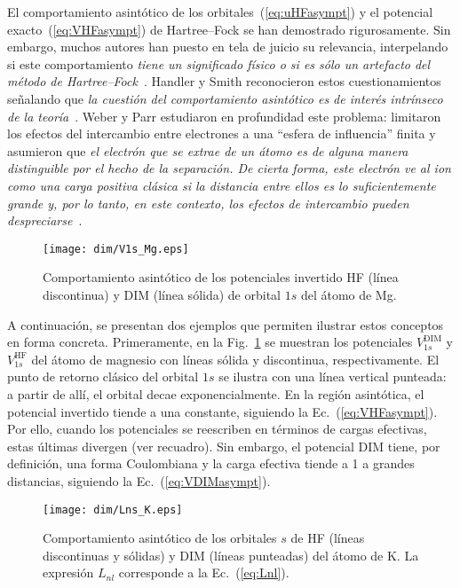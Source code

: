 El comportamiento asintótico de los orbitales~(\ref{eq:uHFasympt}) y el 
potencial exacto~(\ref{eq:VHFasympt}) de Hartree--Fock se han demostrado 
rigurosamente. Sin embargo, muchos autores han puesto en tela de juicio 
su relevancia, interpelando si este comportamiento \textit{tiene un 
significado físico o si es sólo un artefacto del método de 
Hartree--Fock}\myfnote{}~\cite{Handy:69}. Handler y Smith reconocieron 
estos cuestionamientos señalando que \textit{la cuestión del 
comportamiento asintótico es de interés intrínseco de la 
teoría}\myfnote{}~\cite{Handler:80}. Weber y Parr estudiaron en 
profundidad este problema: limitaron los efectos del intercambio entre 
electrones a una ``esfera de influencia'' finita y asumieron que 
\textit{el electrón que se extrae de un átomo es de alguna manera 
distinguible por el hecho de la separación. De cierta 
forma, este electrón ve al ion como una carga positiva clásica si la 
distancia entre ellos es lo suficientemente grande y, por lo tanto, en 
este contexto, los efectos de intercambio pueden 
despreciarse}\myfnote{}~\cite{Weber:71}.

\begin{figure}[t]
\centering
\texttt{[image: dim/V1s\_Mg.eps]} 
\caption[Comportamiento asintótico de los potenciales.]
{Comportamiento asintótico de los potenciales invertido HF (línea 
discontinua) y DIM (línea sólida) de orbital $1s$ del átomo de Mg.}
\label{fig:V1sK}
\end{figure}

A continuación, se presentan dos ejemplos que permiten ilustrar estos 
conceptos en forma concreta. Primeramente, en la Fig.~\ref{fig:V1sK} se 
muestran los potenciales $V_{1s}^{\mathrm{DIM}}$ y $V_{1s}^{\mathrm{HF}}$ 
del átomo de magnesio con líneas sólida y discontinua, respectivamente. 
El punto de retorno clásico del orbital $1s$ se ilustra con una línea 
vertical punteada: a partir de allí, el orbital decae exponencialmente. 
En la región asintótica, el potencial invertido tiende a una constante, 
siguiendo la Ec.~(\ref{eq:VHFasympt}). Por ello, cuando los potenciales 
se reescriben en términos de cargas efectivas, estas últimas divergen 
(ver recuadro). Sin embargo, el potencial DIM tiene, por definición, una 
forma Coulombiana y la carga efectiva tiende a 1 a grandes distancias, 
siguiendo la Ec.~(\ref{eq:VDIMasympt}).

\begin{figure}[t]
\centering
\texttt{[image: dim/Lns\_K.eps]} 
\caption[Comportamiento asintótico de los orbitales HF.]
{Comportamiento asintótico de los orbitales $s$ de HF (líneas 
discontinuas y sólidas) y DIM (líneas punteadas) del átomo de K. La 
expresión $L_{nl}$ corresponde a la Ec.~(\ref{eq:Lnl}).}
\label{fig:LnsK}
\end{figure}

